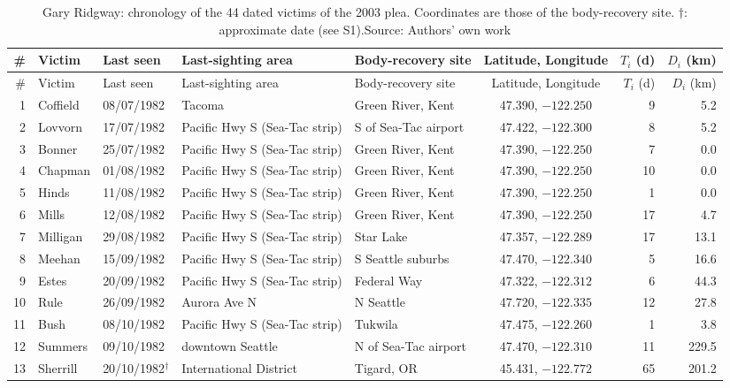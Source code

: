 \documentclass[11pt,a4paper]{article}
\begin{document}
{\footnotesize
\begin{longtable}{rllp{3.1cm}p{3.1cm}crr}
\caption{Gary Ridgway: chronology of the 44 dated victims of the 2003 plea. Coordinates are those of the body-recovery site. $\dagger$: approximate date (see S1).\newline Source: Authors' own work}\\
\toprule
\# & Victim & Last seen & Last-sighting area & Body-recovery site & Latitude, Longitude & $T_i$ (d) & $D_i$ (km)\\
\midrule
\endfirsthead
\toprule
\# & Victim & Last seen & Last-sighting area & Body-recovery site & Latitude, Longitude & $T_i$ (d) & $D_i$ (km)\\
\midrule
\endhead
1 & Coffield & 08/07/1982 & Tacoma & Green River, Kent & 47.390, $-122.250$ & 9 & 5.2\\
2 & Lovvorn & 17/07/1982 & Pacific Hwy S (Sea-Tac strip) & S of Sea-Tac airport & 47.422, $-122.300$ & 8 & 5.2\\
3 & Bonner & 25/07/1982 & Pacific Hwy S (Sea-Tac strip) & Green River, Kent & 47.390, $-122.250$ & 7 & 0.0\\
4 & Chapman & 01/08/1982 & Pacific Hwy S (Sea-Tac strip) & Green River, Kent & 47.390, $-122.250$ & 10 & 0.0\\
5 & Hinds & 11/08/1982 & Pacific Hwy S (Sea-Tac strip) & Green River, Kent & 47.390, $-122.250$ & 1 & 0.0\\
6 & Mills & 12/08/1982 & Pacific Hwy S (Sea-Tac strip) & Green River, Kent & 47.390, $-122.250$ & 17 & 4.7\\
7 & Milligan & 29/08/1982 & Pacific Hwy S (Sea-Tac strip) & Star Lake & 47.357, $-122.289$ & 17 & 13.1\\
8 & Meehan & 15/09/1982 & Pacific Hwy S (Sea-Tac strip) & S Seattle suburbs & 47.470, $-122.340$ & 5 & 16.6\\
9 & Estes & 20/09/1982 & Pacific Hwy S (Sea-Tac strip) & Federal Way & 47.322, $-122.312$ & 6 & 44.3\\
10 & Rule & 26/09/1982 & Aurora Ave N & N Seattle & 47.720, $-122.335$ & 12 & 27.8\\
11 & Bush & 08/10/1982 & Pacific Hwy S (Sea-Tac strip) & Tukwila & 47.475, $-122.260$ & 1 & 3.8\\
12 & Summers & 09/10/1982 & downtown Seattle & N of Sea-Tac airport & 47.470, $-122.310$ & 11 & 229.5\\
13 & Sherrill & 20/10/1982$^\dagger$ & International District & Tigard, OR & 45.431, $-122.772$ & 65 & 201.2\\

\end{longtable}}
\end{document}
